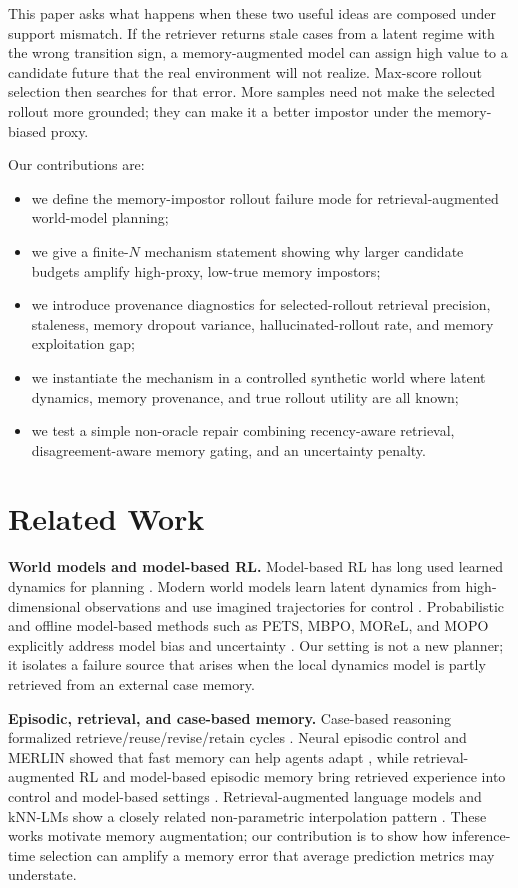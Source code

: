 \documentclass{article}
\begin{document}
This paper asks what happens when these two useful ideas are composed under
support mismatch. If the retriever returns stale cases from a latent regime with
the wrong transition sign, a memory-augmented model can assign high value to a
candidate future that the real environment will not realize. Max-score
rollout selection then searches for that error. More samples need not make the
selected rollout more grounded; they can make it a better impostor under the
memory-biased proxy.

Our contributions are:
\begin{itemize}
    \item we define the memory-impostor rollout failure mode for
    retrieval-augmented world-model planning;
    \item we give a finite-$N$ mechanism statement showing why larger candidate
    budgets amplify high-proxy, low-true memory impostors;
    \item we introduce provenance diagnostics for selected-rollout retrieval
    precision, staleness, memory dropout variance, hallucinated-rollout rate,
    and memory exploitation gap;
    \item we instantiate the mechanism in a controlled synthetic world where
    latent dynamics, memory provenance, and true rollout utility are all known;
    \item we test a simple non-oracle repair combining recency-aware retrieval,
    disagreement-aware memory gating, and an uncertainty penalty.
\end{itemize}

\section{Related Work}

\textbf{World models and model-based RL.}
Model-based RL has long used learned dynamics for planning
\citep{sutton1990dyna}. Modern world models learn latent dynamics from high-dimensional observations and use imagined trajectories for control
\citep{ha2018worldmodels,hafner2019planet,hafner2020dreamer}. Probabilistic and
offline model-based methods such as PETS, MBPO, MOReL, and MOPO explicitly
address model bias and uncertainty \citep{chua2018pets,janner2019mbpo,kidambi2020morel,yu2020mopo}. Our setting is not a new
planner; it isolates a failure source that arises when the local dynamics model
is partly retrieved from an external case memory.

\textbf{Episodic, retrieval, and case-based memory.}
Case-based reasoning formalized retrieve/reuse/revise/retain cycles
\citep{aamodt1994cbr}. Neural episodic control and MERLIN showed that fast
memory can help agents adapt \citep{pritzel2017nec,wayne2018merlin}, while
retrieval-augmented RL and model-based episodic memory bring retrieved
experience into control and model-based settings
\citep{goyal2022rarl,le2021mbem}. Retrieval-augmented language models and
kNN-LMs show a closely related non-parametric interpolation pattern
\citep{khandelwal2020knnlm,guu2020realm,lewis2020rag,borgeaud2022retro,wu2022memorizing}.
These works motivate memory augmentation; our contribution is to show how
inference-time selection can amplify a memory error that average prediction
metrics may understate.
\end{document}
